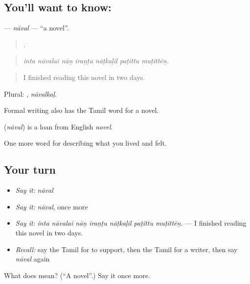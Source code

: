 \subsection*{You'll want to know: }
\textbf{} — \emph{nāval} — \textquotedblleft{}a novel\textquotedblright{}.

\begin{quote}
      .
\end{quote}

\begin{quote}
\emph{inta nāvalai nāṉ iraṇṭu nāṭkaḷil paṭittu muṭittēṉ.}
\end{quote}

\begin{quote}
I finished reading this novel in two days.
\end{quote}

Plural: , \emph{nāvalkaḷ}.

Formal writing also has the Tamil word  for a novel.

\begin{cousinweb}
\textbf{} (\emph{nāval}) is a loan from English \emph{novel}.
\end{cousinweb}

\begin{grammarlens}[title={What you've built}]
One more word for describing what you lived and felt.
\end{grammarlens}

\subsection*{Your turn}
\begin{itemize}
\raggedright
  \item \emph{Say it:} \emph{nāval}
  \item \emph{Say it:} \emph{nāval}, once more
  \item \emph{Say it:} \emph{inta nāvalai nāṉ iraṇṭu nāṭkaḷil paṭittu muṭittēṉ.} — I finished reading this novel in two days.
  \item \emph{Recall:} say the Tamil for to support, then the Tamil for a writer, then say \emph{nāval} again
\end{itemize}

\begin{tcolorbox}[breakable,colback=teal!4,colframe=teal!35!black,title={Before you move on}]
What does  mean? (\textquotedblleft{}A novel\textquotedblright{}.) Say it once more.
\end{tcolorbox}
